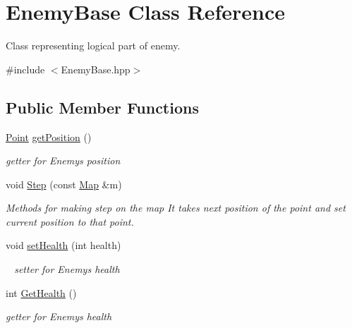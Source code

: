 \hypertarget{class_enemy_base}{}\section{Enemy\+Base Class Reference}
\label{class_enemy_base}


Class representing logical part of enemy.  




{\ttfamily \#include $<$Enemy\+Base.\+hpp$>$}

\subsection*{Public Member Functions}
\begin{DoxyCompactItemize}
\item 
\mbox{\hyperlink{class_point}{Point}} \mbox{\hyperlink{class_enemy_base_a95652c26aa4a75f69b7dac1c63ccde95}{get\+Position}} ()
\begin{DoxyCompactList}\small\item\em getter for Enemy\textquotesingle{}s position \end{DoxyCompactList}\item 
void \mbox{\hyperlink{class_enemy_base_aeae4a4336e40f2f799fafaef9e21f61b}{Step}} (const \mbox{\hyperlink{class_map}{Map}} \&m)
\begin{DoxyCompactList}\small\item\em Methods for making step on the map It takes next position of the point and set current position to that point. \end{DoxyCompactList}\item 
\mbox{\label{class_enemy_base_a24272609863449e7e0502af45450c089}} 
void \mbox{\hyperlink{class_enemy_base_a24272609863449e7e0502af45450c089}{set\+Health}} (int health)
\begin{DoxyCompactList}\small\item\em ~\newline
setter for Enemy\textquotesingle{}s health \end{DoxyCompactList}\item 
int \mbox{\hyperlink{class_enemy_base_accad87636833f0ce585eb1294122d3b3}{Get\+Health}} ()
\begin{DoxyCompactList}\small\item\em getter for Enemy\textquotesingle{}s health \end{DoxyCompactList}\item 

\end{DoxyCompactItemize}
